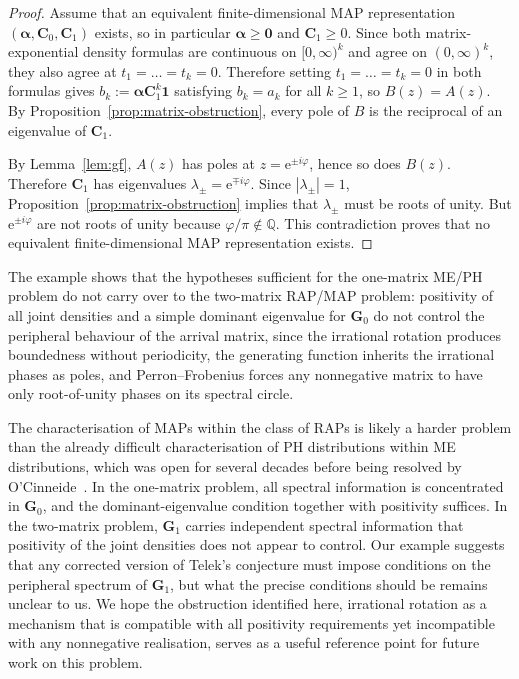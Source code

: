\documentclass[11pt]{article}
\theoremstyle{definition}
\theoremstyle{remark}
\newcommand{\e}{\mathrm{e}}
\newcommand{\bzero}{\bm{0}}
\begin{document}
\begin{proof}
Assume that an equivalent finite-dimensional MAP representation $(\bm{\alpha},\bm{C}_0,\bm{C}_1)$ exists, so in particular $\bm{\alpha}\ge\bzero$ and $\bm{C}_1\ge 0$. Since both matrix-exponential density formulas are continuous on $[0,\infty)^k$ and agree on $(0,\infty)^k$, they also agree at $t_1=\dots=t_k=0$. Therefore setting $t_1=\dots=t_k=0$ in both formulas gives $b_k:=\bm{\alpha}\bm{C}_1^k\bm{1}$ satisfying $b_k=a_k$ for all $k\ge 1$, so $B(z)=A(z)$. By Proposition~\ref{prop:matrix-obstruction}, every pole of $B$ is the reciprocal of an eigenvalue of $\bm{C}_1$.

By Lemma~\ref{lem:gf}, $A(z)$ has poles at $z=\e^{\pm i\varphi}$, hence so does $B(z)$. Therefore $\bm{C}_1$ has eigenvalues $\lambda_\pm=\e^{\mp i\varphi}$. Since $|\lambda_\pm|=1$, Proposition~\ref{prop:matrix-obstruction} implies that $\lambda_\pm$ must be roots of unity. But $\e^{\pm i\varphi}$ are not roots of unity because $\varphi/\pi\notin\mathbb{Q}$. This contradiction proves that no equivalent finite-dimensional MAP representation exists.
\end{proof}

The example shows that the hypotheses sufficient for the one-matrix ME/PH problem do not carry over to the two-matrix RAP/MAP problem: positivity of all joint densities and a simple dominant eigenvalue for $\bm{G}_0$ do not control the peripheral behaviour of the arrival matrix, since the irrational rotation produces boundedness without periodicity, the generating function inherits the irrational phases as poles, and Perron--Frobenius forces any nonnegative matrix to have only root-of-unity phases on its spectral circle.

The characterisation of MAPs within the class of RAPs is likely a harder problem than the already difficult characterisation of PH distributions within ME distributions, which was open for several decades before being resolved by O'Cinneide~\cite{OCinneide1990}. In the one-matrix problem, all spectral information is concentrated in $\bm{G}_0$, and the dominant-eigenvalue condition together with positivity suffices. In the two-matrix problem, $\bm{G}_1$ carries independent spectral information that positivity of the joint densities does not appear to control. Our example suggests that any corrected version of Telek's conjecture must impose conditions on the peripheral spectrum of $\bm{G}_1$, but what the precise conditions should be remains unclear to us. We hope the obstruction identified here, irrational rotation as a mechanism that is compatible with all positivity requirements yet incompatible with any nonnegative realisation, serves as a useful reference point for future work on this problem.



\end{document}
